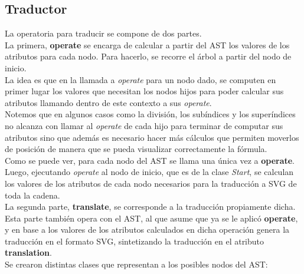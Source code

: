 \subsection{Traductor}
\indent \indent  La operatoria para traducir se compone de dos partes.\\
\indent La primera, \textbf{operate} se encarga de calcular a partir del AST los valores de los atributos para cada nodo. Para hacerlo, se recorre el árbol a partir del nodo de inicio.\\
\indent La idea es que en la llamada a \textit{operate} para un nodo dado, se computen en primer lugar los valores que necesitan los nodos hijos para poder calcular sus atributos llamando dentro de este contexto a sus \textit{operate}.\\
\indent Notemos que en algunos casos como la división, los subíndices y los superíndices no alcanza con llamar al \textit{operate} de cada hijo para terminar de computar sus atributos sino que además es necesario hacer más cálculos que permiten moverlos de posición de manera que se pueda visualizar correctamente la fórmula.\\
\indent Como se puede ver, para cada nodo del AST se llama una única vez a \textbf{operate}. Luego, ejecutando \textit{operate} al nodo de inicio, que es de la clase \textit{Start}, se calculan los valores de los atributos de cada nodo necesarios para la traducción a SVG de toda la cadena.\\
\indent \indent La segunda parte, \textbf{translate}, se corresponde a la traducción propiamente dicha. Esta parte también opera con el AST, al que asume que ya se le aplicó \textbf{operate}, y en base a los valores de los atributos calculados en dicha operación genera la traducción en el formato SVG, sintetizando la traducción en el atributo \textbf{translation}.\\
\indent Se crearon distintas clases que representan a los posibles nodos del AST:
